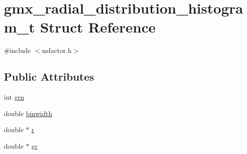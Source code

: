 \hypertarget{structgmx__radial__distribution__histogram__t}{\section{gmx\-\_\-radial\-\_\-distribution\-\_\-histogram\-\_\-t \-Struct \-Reference}
\label{structgmx__radial__distribution__histogram__t}
}


{\ttfamily \#include $<$nsfactor.\-h$>$}

\subsection*{\-Public \-Attributes}
\begin{DoxyCompactItemize}
\item 
int \hyperlink{structgmx__radial__distribution__histogram__t_a5ba2debd5f5f792b326e25e1e2b91aae}{grn}
\item 
double \hyperlink{structgmx__radial__distribution__histogram__t_aabf444f8dcb7714c98c248387aefa08b}{binwidth}
\item 
double $\ast$ \hyperlink{structgmx__radial__distribution__histogram__t_aa389812a0f8d42b5dbd5e940d7d0158e}{r}
\item 
double $\ast$ \hyperlink{structgmx__radial__distribution__histogram__t_a946e8fc3c84a66fa48200c9a8acc260d}{gr}
\end{DoxyCompactItemize}


